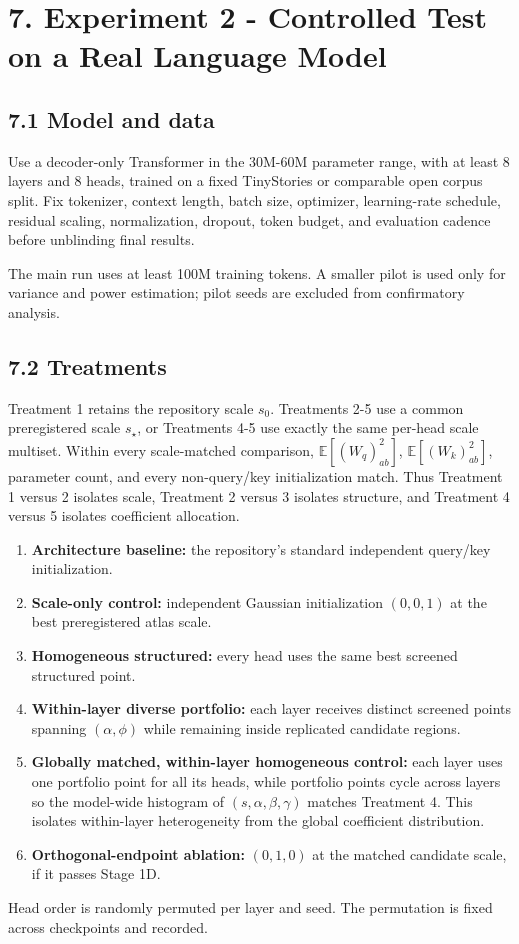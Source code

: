 \documentclass[11pt,letterpaper]{article}
\theoremstyle{definition}
\begin{document}
\section{7. Experiment 2 - Controlled Test on a Real Language Model}
\subsection{7.1 Model and data}
Use a decoder-only Transformer in the 30M-60M parameter range, with at least 8 layers and 8 heads, trained on a fixed TinyStories or comparable open corpus split. Fix tokenizer, context length, batch size, optimizer, learning-rate schedule, residual scaling, normalization, dropout, token budget, and evaluation cadence before unblinding final results.

The main run uses at least 100M training tokens. A smaller pilot is used only for variance and power estimation; pilot seeds are excluded from confirmatory analysis.

\subsection{7.2 Treatments}
Treatment 1 retains the repository scale $s_0$. Treatments 2-5 use a common preregistered scale $s_\star$, or Treatments 4-5 use exactly the same per-head scale multiset. Within every scale-matched comparison, $\mathbb E[(W_q)_{ab}^2]$, $\mathbb E[(W_k)_{ab}^2]$, parameter count, and every non-query/key initialization match. Thus Treatment 1 versus 2 isolates scale, Treatment 2 versus 3 isolates structure, and Treatment 4 versus 5 isolates coefficient allocation.

\begin{enumerate}
  \item \textbf{Architecture baseline:} the repository's standard independent query/key initialization.
  \item \textbf{Scale-only control:} independent Gaussian initialization $(0,0,1)$ at the best preregistered atlas scale.
  \item \textbf{Homogeneous structured:} every head uses the same best screened structured point.
  \item \textbf{Within-layer diverse portfolio:} each layer receives distinct screened points spanning $(\alpha,\phi)$ while remaining inside replicated candidate regions.
  \item \textbf{Globally matched, within-layer homogeneous control:} each layer uses one portfolio point for all its heads, while portfolio points cycle across layers so the model-wide histogram of $(s,\alpha,\beta,\gamma)$ matches Treatment 4. This isolates within-layer heterogeneity from the global coefficient distribution.
  \item \textbf{Orthogonal-endpoint ablation:} $(0,1,0)$ at the matched candidate scale, if it passes Stage 1D.
\end{enumerate}
Head order is randomly permuted per layer and seed. The permutation is fixed across checkpoints and recorded.
\end{document}

